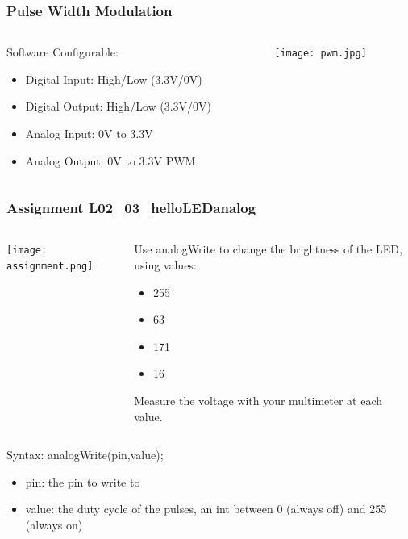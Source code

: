 \documentclass{beamer}
\begin{document}
\begin{frame}\frametitle{Pulse Width Modulation}
\begin{columns}
\begin{column}{5.5cm}
Software Configurable:
\begin{itemize}
\item Digital Input: High/Low (3.3V/0V)
\item Digital Output: High/Low (3.3V/0V)
\item Analog Input: 0V to 3.3V
\item Analog Output: 0V to 3.3V PWM
\end{itemize}
\end{column}
\begin{column}{4cm}
\begin{overprint}
\texttt{[image: pwm.jpg]}
\end{overprint}
\end{column}
\end{columns}
\end{frame}


\begin{frame}\frametitle{Assignment L02\_03\_helloLEDanalog}
\begin{columns}
\begin{column}{4cm}
\begin{overprint}
\texttt{[image: assignment.png]}
\end{overprint}
\end{column}
\begin{column}{6cm}
Use analogWrite to change the brightness of the LED, using values:
\begin{itemize}
\item 255
\item 63
\item 171
\item 16
\end{itemize}
Measure the voltage with your multimeter at each value.
\end{column}
\end{columns}

\vspace{1cm}

Syntax: analogWrite(pin,value);
\begin{itemize}
\item pin: the pin to write to
\item value: the duty cycle of the pulses, an int between 0 (always off) and 255 (always on) 
\end{itemize}
\end{frame}
\end{document}
